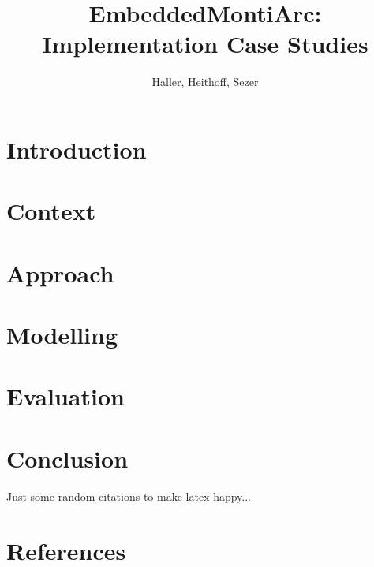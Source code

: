 \documentclass[review]{elsarticle}
\begin{document}
\begin{frontmatter}

\title{EmbeddedMontiArc: Implementation Case Studies}
\tnotetext[mytitlenote]{}

\author{Haller, Heithoff, Sezer}
\address{RWTH Aachen}


\begin{abstract}

\end{abstract}

\begin{keyword}

\end{keyword}

\end{frontmatter}

\linenumbers

\section{Introduction}


\section{Context}


\section{Approach}


\section{Modelling}


\section{Evaluation}


\section{Conclusion}



Just some random citations to make latex happy...
\cite{Feynman1963118,Dirac1953888}


\section*{References}


\end{document}
